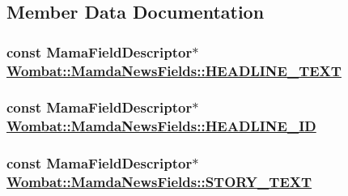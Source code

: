 \subsection{Member Data Documentation}
\hypertarget{classWombat_1_1MamdaNewsFields_df0770dbf356ee43cc6cc20e9ab64843}{
\subsubsection[HEADLINE\_\-TEXT]{\setlength{\rightskip}{0pt plus 5cm}const Mama\-Field\-Descriptor$\ast$ \hyperlink{classWombat_1_1MamdaNewsFields_df0770dbf356ee43cc6cc20e9ab64843}{Wombat::Mamda\-News\-Fields::HEADLINE\_\-TEXT}}}
\label{classWombat_1_1MamdaNewsFields_df0770dbf356ee43cc6cc20e9ab64843}


\hypertarget{classWombat_1_1MamdaNewsFields_1ac44bc2c63050375b991c8f00e60b25}{
\subsubsection[HEADLINE\_\-ID]{\setlength{\rightskip}{0pt plus 5cm}const Mama\-Field\-Descriptor$\ast$ \hyperlink{classWombat_1_1MamdaNewsFields_1ac44bc2c63050375b991c8f00e60b25}{Wombat::Mamda\-News\-Fields::HEADLINE\_\-ID}}}
\label{classWombat_1_1MamdaNewsFields_1ac44bc2c63050375b991c8f00e60b25}


\hypertarget{classWombat_1_1MamdaNewsFields_11e94d0ee71a5c90649aeca33a4a07c5}{
\subsubsection[STORY\_\-TEXT]{\setlength{\rightskip}{0pt plus 5cm}const Mama\-Field\-Descriptor$\ast$ \hyperlink{classWombat_1_1MamdaNewsFields_11e94d0ee71a5c90649aeca33a4a07c5}{Wombat::Mamda\-News\-Fields::STORY\_\-TEXT}}}
\label{classWombat_1_1MamdaNewsFields_11e94d0ee71a5c90649aeca33a4a07c5}


